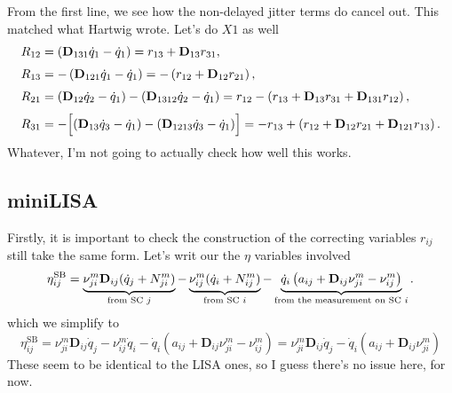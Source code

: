 \documentclass[11pt]{article}
\begin{document}
From the first line, we see how the non-delayed jitter terms do cancel out. This matched what Hartwig wrote. Let's do $X1$ as well
\begin{align*}
R_{12}
&= \left(\mathbf{D}_{131}\dot q_1-\dot q_1\right)
= r_{13} + \mathbf{D}_{13}r_{31},\\[3pt]
R_{13}
&= -\left(\mathbf{D}_{121}\dot q_1-\dot q_1\right)
= -\left(r_{12}+\mathbf{D}_{12}r_{21}\right),\\[3pt]
R_{21}
&= \left(\mathbf{D}_{12}\dot q_2-\dot q_1\right)
-\left(\mathbf{D}_{1312}\dot q_2-\dot q_1\right)
= r_{12}-\left(r_{13}+\mathbf{D}_{13}r_{31}+\mathbf{D}_{131}r_{12}\right),\\[3pt]
R_{31}
&= -\Bigl[\left(\mathbf{D}_{13}\dot q_3-\dot q_1\right)
-\left(\mathbf{D}_{1213}\dot q_3-\dot q_1\right)\Bigr]
= -r_{13}+\left(r_{12}+\mathbf{D}_{12}r_{21}+\mathbf{D}_{121}r_{13}\right).
\end{align*}
Whatever, I'm not going to actually check how well this works.

\subsection{miniLISA}
Firstly, it is important to check the construction of the correcting variables $r_{ij}$ still take the same form. Let's writ our the $\eta$ variables involved
\begin{equation*}
\eta^{\text{SB}}_{ij} =
\underbrace{%
    \nu_{j i}^{m} \mathbf{D}_{ij} (\dot{q}_j + N_{j i}^{m})
}_{\text{from SC $j$}}
-
\underbrace{%
    \nu_{i j}^{m} (\dot{q}_i + N_{i j}^{m})
}_{\text{from SC $i$}}
-
\underbrace{%
    \dot{q}_i \left( a_{ij} + \mathbf{D}_{ij} \nu_{j i}^{m} - \nu_{i j}^{m} \right)
}_{\text{from the measurement on SC $i$}}.
\end{equation*}
which we simplify to
\begin{equation*}
    \eta^{\text{SB}}_{ij}=\nu_{j i}^{m} \mathbf{D}_{ij} \dot{q}_j
-\nu_{i j}^{m} \dot{q}_i -\dot{q}_i \left( a_{ij} + \mathbf{D}_{ij} \nu_{j i}^{m} - \nu_{i j}^{m} \right)=\nu_{j i}^{m} \mathbf{D}_{ij} \dot{q}_j -\dot{q}_i \left( a_{ij} + \mathbf{D}_{ij} \nu_{j i}^{m} \right)
\end{equation*}
These seem to be identical to the LISA ones, so I guess there's no issue here, for now. 
\end{document}
